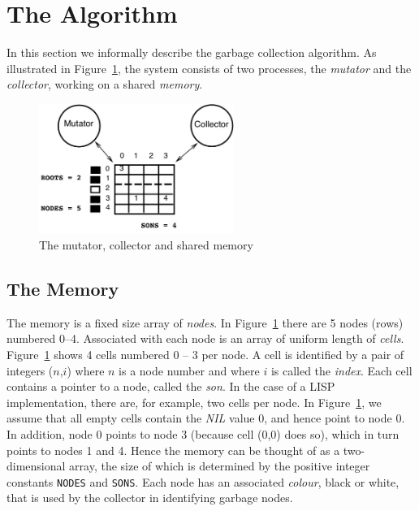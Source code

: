          
\section{The Algorithm}
\label{informal-specification}

In  this  section   we  informally  describe the   garbage  collection
algorithm.   As illustrated  in    Figure~\ref{gc-figure}, the  system
consists of two processes, the  {\em mutator} and the {\em collector},
working on a shared {\em memory}.

\begin{figure}[htb]
\center
\includegraphics[width=2.5in]{gc-fig.jpeg}
\caption{The mutator, collector and shared memory}
\label{gc-figure}
\end{figure}

\subsection{The Memory}

The memory is a fixed size array of  {\em nodes}.  In
Figure~\ref{gc-figure} there 
are 5 nodes (rows) numbered 0--4.  Associated with  each node is an
array of uniform  length of {\em cells}.     Figure~\ref{gc-figure} shows
4 cells numbered 0 -- 3 per node.  A cell is  identified by a pair
of  integers ($n$,$i$) where  $n$ is  a node number  and where  $i$ is
called   the {\em index}.   Each  cell  contains a pointer   to a node,
called the {\em son}.  In the case   of a LISP  implementation, there  are, for
example, two  cells per node.  In   Figure~\ref{gc-figure}, we  assume
that all empty 
cells contain  the  {\em NIL} value 0,   and hence point to   node 0.  In
addition, node 0 points to node 3 (because  cell (0,0) does so), which
in turn points to nodes 1 and  4.  Hence the memory  can be thought of
as a two-dimensional  array, the  size of  which is  determined by the
positive integer constants  {\tt NODES} and {\tt  SONS}\@.   Each node
has an  associated  {\em colour},  black or white,  that  is used by the
collector in identifying garbage nodes.


